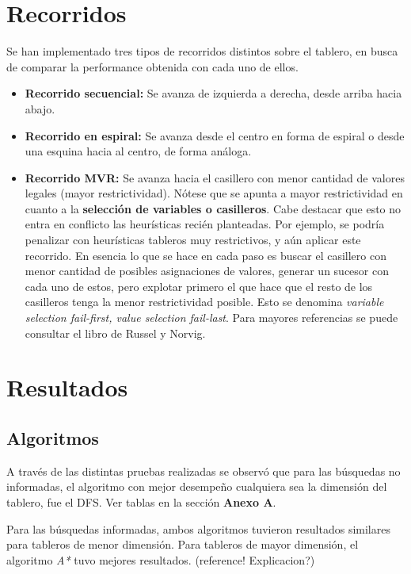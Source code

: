 \documentclass[%
    final,
    reprint,
    notitlepage,
    narroweqnarray,
    inline,
    twoside,
    invited
    ]{ieee}
\begin{document}
\section{Recorridos}

\par Se han implementado tres tipos de recorridos distintos sobre el tablero, en busca de comparar la performance obtenida con cada uno de ellos.\\

\begin{itemize}
\item \textbf{Recorrido secuencial: } Se avanza de izquierda a derecha, desde arriba hacia abajo.
\item \textbf{Recorrido en espiral: } Se avanza desde el centro en forma de espiral o desde una esquina hacia al centro, de forma análoga.
\item \textbf{Recorrido MVR: } Se avanza hacia el casillero con menor cantidad de valores legales (mayor restrictividad). Nótese que se apunta 
a mayor restrictividad en cuanto a la \textbf{selección de variables o casilleros}. Cabe destacar que esto no 
entra en conflicto las heurísticas recién planteadas. Por ejemplo, se podría penalizar con heurísticas tableros muy restrictivos, y aún aplicar este 
recorrido. En esencia lo que se hace en cada paso es buscar el casillero con menor cantidad de posibles asignaciones de valores, generar un sucesor 
con cada uno de estos, pero explotar primero el que hace que el resto de los casilleros tenga la menor restrictividad posible. Esto se denomina 
\textit{ variable selection fail-first, value selection fail-last}. Para mayores referencias se puede consultar el libro de Russel y Norvig.
\end{itemize}

\section{Resultados}

\subsection{Algoritmos}

\par A través de las distintas pruebas realizadas se observó que para las búsquedas no informadas, el algoritmo con mejor desempeño cualquiera 
sea la dimensión del tablero, fue el DFS. Ver tablas en la sección \textbf{Anexo A}. 
\par Para las búsquedas informadas, ambos algoritmos tuvieron resultados similares para tableros de menor dimensión. Para tableros de mayor dimensión, 
el algoritmo \textit{A*} tuvo mejores resultados. (reference! Explicacion?)
\end{document}
